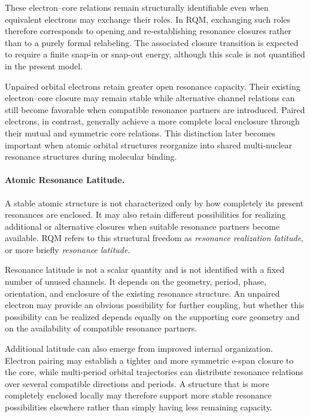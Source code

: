 \documentclass[11pt,a4paper]{article}
\begin{document}
These electron–core relations remain structurally identifiable even when equivalent electrons may exchange their roles. In RQM, exchanging such roles therefore corresponds to opening and re-establishing resonance closures rather than to a purely formal relabeling. The associated closure transition is expected to require a finite snap-in or snap-out energy, although this scale is not quantified in the present model.

Unpaired orbital electrons retain greater open resonance capacity. Their existing electron–core closure may remain stable while alternative channel relations can still become favorable when compatible resonance partners are introduced. Paired electrons, in contrast, generally achieve a more complete local enclosure through their mutual and symmetric core relations. This distinction later becomes important when atomic orbital structures reorganize into shared multi-nuclear resonance structures during molecular binding.



\paragraph{Atomic Resonance Latitude.}
A stable atomic structure is not characterized only by how completely its present resonances are enclosed. It may also retain different possibilities for realizing additional or alternative closures when suitable resonance partners become available. RQM refers to this structural freedom as \emph{resonance realization latitude}, or more briefly \emph{resonance latitude}.

Resonance latitude is not a scalar quantity and is not identified with a fixed number of unused channels. It depends on the geometry, period, phase, orientation, and enclosure of the existing resonance structure. An unpaired electron may provide an obvious possibility for further coupling, but whether this possibility can be realized depends equally on the supporting core geometry and on the availability of compatible resonance partners.

Additional latitude can also emerge from improved internal organization. Electron pairing may establish a tighter and more symmetric e-span closure to the core, while multi-period orbital trajectories can distribute resonance relations over several compatible directions and periods. A structure that is more completely enclosed locally may therefore support more stable resonance possibilities elsewhere rather than simply having less remaining capacity.
\end{document}

